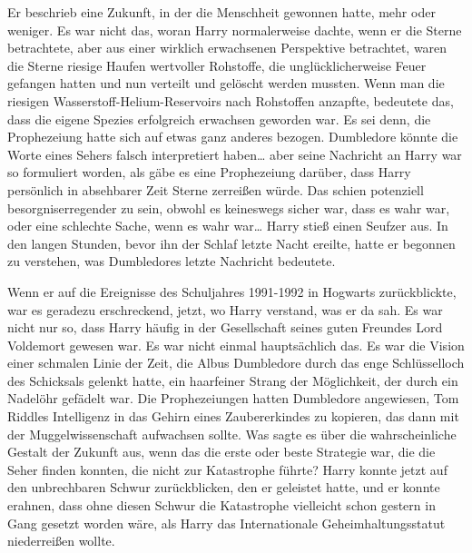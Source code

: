 {Er beschrieb eine Zukunft, in der die Menschheit gewonnen hatte, mehr oder weniger. Es war nicht das, woran Harry normalerweise dachte, wenn er die Sterne betrachtete, aber aus einer wirklich erwachsenen Perspektive betrachtet, waren die Sterne riesige Haufen wertvoller Rohstoffe, die unglücklicherweise Feuer gefangen hatten und nun verteilt und gelöscht werden mussten. Wenn man die riesigen Wasserstoff-Helium-Reservoirs nach Rohstoffen anzapfte, bedeutete das, dass die eigene Spezies erfolgreich erwachsen geworden war. Es sei denn, die Prophezeiung hatte sich auf etwas ganz anderes bezogen. Dumbledore könnte die Worte eines Sehers falsch interpretiert haben… aber seine Nachricht an Harry war so formuliert worden, als gäbe es eine Prophezeiung darüber, dass Harry persönlich in absehbarer Zeit Sterne zerreißen würde. Das schien potenziell besorgniserregender zu sein, obwohl es keineswegs sicher war, dass es wahr war, oder eine schlechte Sache, wenn es wahr war… Harry stieß einen Seufzer aus. In den langen Stunden, bevor ihn der Schlaf letzte Nacht ereilte, hatte er begonnen zu verstehen, was Dumbledores letzte Nachricht bedeutete.

Wenn er auf die Ereignisse des Schuljahres 1991-1992 in Hogwarts zurückblickte, war es geradezu erschreckend, jetzt, wo Harry verstand, was er da sah. Es war nicht nur so, dass Harry häufig in der Gesellschaft seines guten Freundes Lord Voldemort gewesen war. Es war nicht einmal hauptsächlich das. Es war die Vision einer schmalen Linie der Zeit, die Albus Dumbledore durch das enge Schlüsselloch des Schicksals gelenkt hatte, ein haarfeiner Strang der Möglichkeit, der durch ein Nadelöhr gefädelt war. Die Prophezeiungen hatten Dumbledore angewiesen, Tom Riddles Intelligenz in das Gehirn eines Zaubererkindes zu kopieren, das dann mit der Muggelwissenschaft aufwachsen sollte. Was sagte es über die wahrscheinliche Gestalt der Zukunft aus, wenn das die erste oder beste Strategie war, die die Seher finden konnten, die nicht zur Katastrophe führte? Harry konnte jetzt auf den unbrechbaren Schwur zurückblicken, den er geleistet hatte, und er konnte erahnen, dass ohne diesen Schwur die Katastrophe vielleicht schon gestern in Gang gesetzt worden wäre, als Harry das Internationale Geheimhaltungsstatut niederreißen wollte.

}
